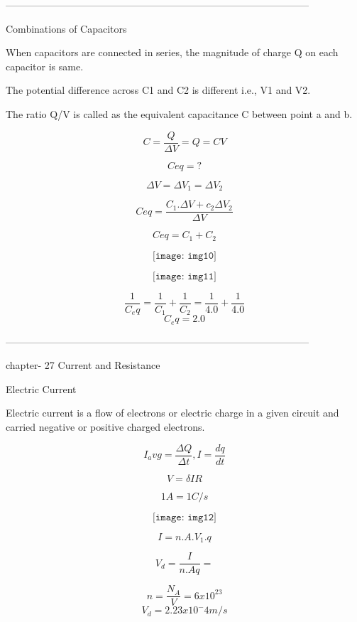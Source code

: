 \documentclass[11pt] {article}
\begin{document}
\vspace{35mm} %
--------------------------------------------------------------------------------------------
\begin{center}
Combinations of Capacitors
\end{center}

When capacitors are connected in series, the magnitude of charge Q on each capacitor is same. 

The potential difference across C1 and C2 is different i.e., V1 and V2. 

The ratio Q/V is called as the equivalent capacitance C between point a and b.

$$C = \frac{Q}{\Delta{V}} = Q = CV$$

$$Ceq = ?$$

$$\Delta{V} = \Delta{V_1} = \Delta{V_2}$$

$$Ceq = \frac{C_1 . \Delta{V} + c_2 \Delta{V_2}}{\Delta{V}}$$

$$Ceq = C_1 + C_2$$

\vspace{10mm} %
$$\texttt{[image: img10]}$$

\vspace{5mm} %
$$\texttt{[image: img11]}$$

$$\frac{1}{C_eq} = \frac{1}{C_1} + \frac{1}{C_2} = \frac{1}{4.0} + \frac{1}{4.0}$$
$$C_eq = 2.0$$

\begin{center}
--------------------------------------------------------------------------------------------
\end{center}
chapter- 27 Current and Resistance
\begin{center}
 Electric Current
\end{center}
Electric current is a flow of electrons or electric charge in a given circuit and carried negative or positive charged electrons.

$$I_avg = \frac{\Delta{Q}}{\Delta{t}} , I = \frac{dq}{dt}$$

$$V = \delta{I}{R}$$

$$1A = 1 C/ s$$

$$\texttt{[image: img12]}$$

$$I = n . A . V_1 . q$$

$$V_d = \frac {I}{n.Aq} =$$

$$n = \frac{N_A}{V} = 6 x 10^23$$
$$V_d = 2.23 x 10^-4 m/s$$
\end{document}
